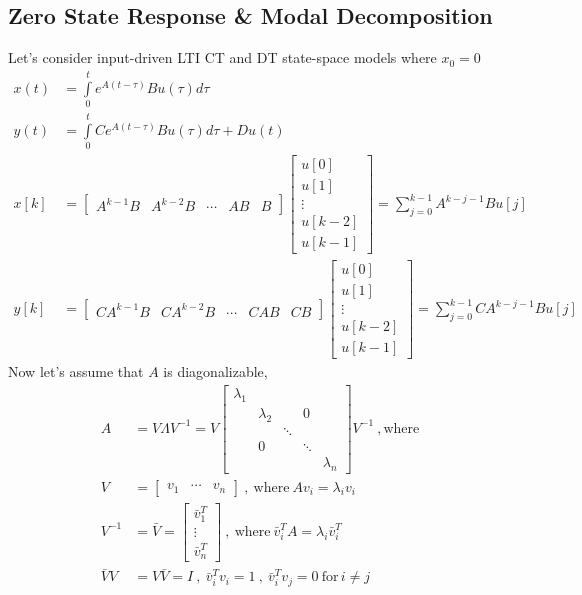 \documentclass[twoside]{article}
\begin{document}
\subsection{Zero State Response \& Modal Decomposition}

Let's consider input-driven LTI CT and DT state-space models where $x_0 = 0$
%
\begin{align*}
  x(t) &= \int\limits_{0}^{t} e^{A ( t - \tau ) } B u(\tau) d\tau
\\[1ex]
  y(t) &= \int\limits_{0}^{t} C e^{A ( t - \tau ) } B u(\tau) d\tau + D u(t)
       \\[1ex]
  x[k]  &= \left[ \begin{array}{c|c|c|c|c} A^{k-1} B & A^{k-2} B &
         \cdots & A B & B \end{array} \right]
         \begin{bmatrix}
                  u[0] \\ u[1] \\ \vdots \\ u[k-2] \\ u[k-1]
         \end{bmatrix}
         = \sum\limits_{j = 0}^{k-1} A^{k-j-1} B u[j]
\\[1ex]
  y[k]  &= \left[ \begin{array}{c|c|c|c|c} C A^{k-1} B & C A^{k-2} B &
         \cdots & C A B & C B \end{array} \right]
         \begin{bmatrix}
                  u[0] \\ u[1] \\ \vdots \\ u[k-2] \\ u[k-1]
         \end{bmatrix}
         = \sum\limits_{j = 0}^{k-1} C A^{k-j-1} B u[j]
\end{align*}
%
Now let's assume that $A$ is diagonalizable, 
%
\begin{align*}
    A &= V \Lambda V^{-1} = V \begin{bmatrix} \lambda_1 & & & & \\ & \lambda_2 & & 0 & \\ & & \ddots & & \\ & 0 & & \ddots & \\ & & & & \lambda_n \end{bmatrix} V^{-1} \ , \mathrm{where}
    \\[1ex]
     V &= \begin{bmatrix} v_1 & \cdots & v_n \end{bmatrix} \ , \ \mathrm{where} \ A v_i = \lambda_i v_i 
 \\[1ex]
 V^{-1} &= \bar{V} =  \begin{bmatrix} \bar{v}_1^T \\ \vdots \\ \bar{v}_n^T \end{bmatrix} \ , \ \mathrm{where} \ \bar{v}_i^T A = \lambda_i \bar{v}_i^T
  \\[1ex]
\bar{V} V &= V \bar{V} = I \ , \ \bar{v}_i^T v_i = 1 \ , \  \bar{v}_i^T v_j = 0 \ \mathrm{for} \, i \neq j
\end{align*}
\end{document}

